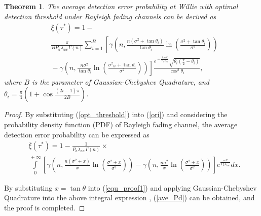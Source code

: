 \documentclass[conference]{IEEEtran}
\newtheorem{theorem}{Theorem}
\begin{document}
\begin{theorem}
	The average detection error probability at Willie with optimal detection threshold under Rayleigh fading channels can be derived as
	\begin{equation}\label{ave_Pd}
		\begin{aligned}
			&\overline {{\xi }}\left( {{\tau ^*}} \right)  =1 - \\
			 &\frac{\pi }{{B{P_a}{\lambda _{aw}}\Gamma \!\left(\! n \!\right)\!}}\sum\limits_{i = 1}^B {\!\left[\! {\gamma \!\left(\!\! {n,\frac{{n\left( {{\sigma ^2} \!+\! \tan {\theta _i}} \right)}}{{\tan {\theta _i}}}\ln \!\left(\! {\frac{{{\sigma ^2} \!+\! \tan {\theta _i}}}{{{\sigma ^2}}}} \!\right)\!} \!\right)\!} \right.}  \\
			&\left. { \!- \gamma \!\left(\! {n,\frac{{n{\sigma ^2}}}{{\tan {\theta _i}}}\ln \!\left(\! {\frac{{{\sigma ^2}_w \!+\! \tan {\theta _i}}}{{{\sigma ^2}}}} \!\right)\!} \!\right)\!} \right]\frac{{{e^{ \!- \frac{{\tan {\theta _i}}}{{{P_a}{\lambda _{aw}}}}}}\sqrt {{\theta _i}\left( {\frac{\pi }{2} \!-\! {\theta _i}} \right)} }}{{{{\cos }^2}{\theta _i}}},
		\end{aligned}
	\end{equation}
	where $B$ is the parameter of Gaussian-Chebyshev Quadrature, and ${\theta _i} = \frac{\pi }{4}\left( {1 + \cos \frac{{\left( {2i - 1} \right)\pi }}{{2B}}} \right)$.
\end{theorem}

\begin{proof}	
	By substituting (\ref{opt_threshold}) into (\ref{ori}) and considering the probability density function (PDF) of Rayleigh fading channel, the average detection error probability can be expressed as
	\begin{equation}\label{equ_proof1}
		\begin{aligned}
			&\overline {{\xi}}\left( {{\tau ^*}} \right)= 1 - \frac{1}{{{P_a}{\lambda _{aw}}\Gamma \left( n \right)}} \times\\
			 & \!\!\int\limits_0^{ \!+\! \infty } {\!\left[\! {\gamma \!\!\left(\! {n,\!\frac{{n\!\left(\! {{\sigma ^2} \!+\! x} \right)}}{x}\!\!\ln\!\! \left(\! {\frac{{{\sigma ^2} \!\!+\!\! x}}{{{\sigma ^2}}}} \!\!\right)\!\!} \!\right)\! \!-\! \gamma \!\!\left(\! {n\!,\!\frac{{n{\sigma ^2}}}{x}\!\ln \!\left(\!\! {\frac{{{\sigma ^2} \!\!+\!\! x}}{{{\sigma ^2}}}} \!\!\right)\!} \!\right)\!} \!\right]\!\!{e^{ \frac{-x}{{{P_a}\!{\lambda _{aw}}}}}}\!dx}.\!
		\end{aligned}
	\end{equation}

By substituting $x=\tan \theta$ into (\ref{equ_proof1}) and applying Gaussian-Chebyshev Quadrature into the above integral expression \cite{Quadrature}, (\ref{ave_Pd}) can be obtained, and the proof is completed.
\end{proof}
\end{document}
